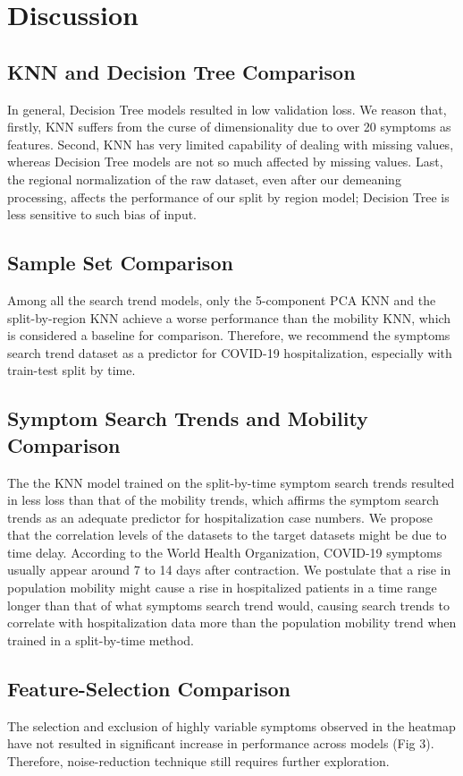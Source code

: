 \documentclass[12pt]{article}
\begin{document}
\section{Discussion}

\subsection{KNN and Decision Tree Comparison}
In general, Decision Tree models resulted in low validation loss. We reason that, firstly, KNN suffers from the curse of dimensionality due to over 20 symptoms as features. Second, KNN has very limited capability of dealing with missing values, whereas Decision Tree models are not so much affected by missing values. Last, the regional normalization of the raw dataset, even after our demeaning processing, affects the performance of our split by region model; Decision Tree is less sensitive to such bias of input.

\subsection{Sample Set Comparison}
Among all the search trend models, only the 5-component PCA KNN and the split-by-region KNN achieve a worse performance than the mobility KNN, which is considered a baseline for comparison. Therefore, we recommend the symptoms search trend dataset as a predictor for COVID-19 hospitalization, especially with train-test split by time.

\subsection{Symptom Search Trends and Mobility Comparison}
The the KNN model trained on the split-by-time symptom search trends resulted in less loss than that of the mobility trends, which affirms the symptom search trends as an adequate predictor for hospitalization case numbers. We propose that the correlation levels of the datasets to the target datasets might be due to time delay. According to the World Health Organization, COVID-19 symptoms usually appear around 7 to 14 days after contraction. We postulate that a rise in population mobility might cause a rise in hospitalized patients in a time range longer than that of what symptoms search trend would, causing search trends to correlate with hospitalization data more than the population mobility trend when trained in a split-by-time method.

\subsection{Feature-Selection Comparison}
The selection and exclusion of highly variable symptoms observed in the heatmap have not resulted in significant increase in performance across models (Fig 3). Therefore, noise-reduction technique still requires further exploration.
\end{document}
